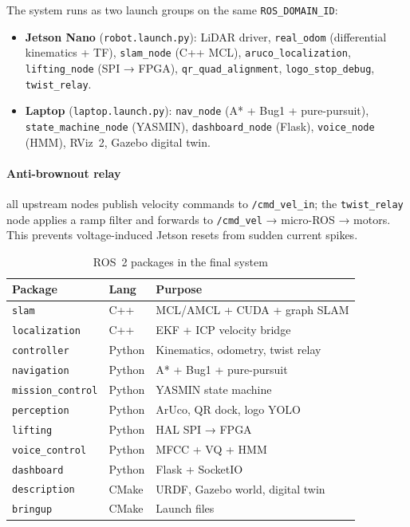 \documentclass[conference]{IEEEtran}
\begin{document}
The system runs as two launch groups on the same \texttt{ROS\_DOMAIN\_ID}:

\begin{itemize}[noitemsep, leftmargin=*]
  \item \textbf{Jetson Nano} (\texttt{robot.launch.py}): LiDAR driver,
        \texttt{real\_odom} (differential kinematics + TF),
        \texttt{slam\_node} (C++ MCL), \texttt{aruco\_localization},
        \texttt{lifting\_node} (SPI → FPGA), \texttt{qr\_quad\_alignment},
        \texttt{logo\_stop\_debug}, \texttt{twist\_relay}.
  \item \textbf{Laptop} (\texttt{laptop.launch.py}): \texttt{nav\_node}
        (A* + Bug1 + pure-pursuit), \texttt{state\_machine\_node}
        (YASMIN), \texttt{dashboard\_node} (Flask), \texttt{voice\_node}
        (HMM), RViz~2, Gazebo digital twin.
\end{itemize}

\paragraph{Anti-brownout relay} all upstream nodes publish velocity
commands to \texttt{/cmd\_vel\_in}; the \texttt{twist\_relay} node
applies a ramp filter and forwards to \texttt{/cmd\_vel} → micro-ROS →
motors. This prevents voltage-induced Jetson resets from sudden current
spikes.

\begin{table}[h]
\caption{ROS~2 packages in the final system}
\label{tab:packages}
\renewcommand{\arraystretch}{1.2}
\centering
\begin{tabular}{>{\raggedright}p{2.2cm}
                >{\centering}p{1.0cm}
                >{\raggedright\arraybackslash}p{4.2cm}}
\toprule
\textbf{Package} & \textbf{Lang} & \textbf{Purpose} \\
\midrule
\texttt{slam}          & C++    & MCL/AMCL + CUDA + graph SLAM \\
\texttt{localization}  & C++    & EKF + ICP velocity bridge \\
\texttt{controller}    & Python & Kinematics, odometry, twist relay \\
\texttt{navigation}    & Python & A* + Bug1 + pure-pursuit \\
\texttt{mission\_control} & Python & YASMIN state machine \\
\texttt{perception}    & Python & ArUco, QR dock, logo YOLO \\
\texttt{lifting}       & Python & HAL SPI → FPGA \\
\texttt{voice\_control} & Python & MFCC + VQ + HMM \\
\texttt{dashboard}     & Python & Flask + SocketIO \\
\texttt{description}   & CMake  & URDF, Gazebo world, digital twin \\
\texttt{bringup}       & CMake  & Launch files \\
\bottomrule
\end{tabular}
\end{table}
\end{document}

